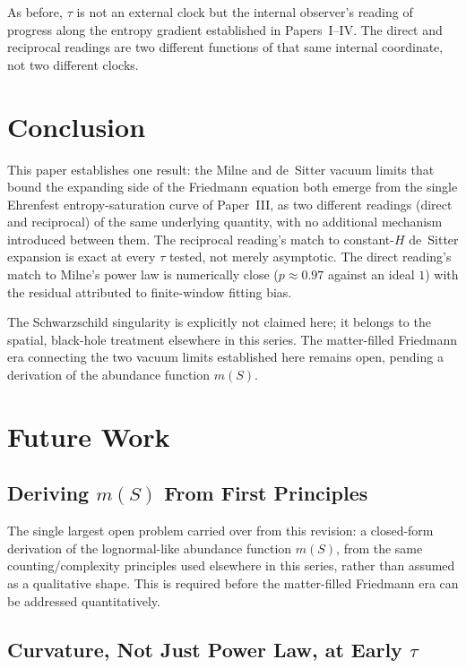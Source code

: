\documentclass[11pt]{article}
\begin{document}
As before, $\tau$ is not an external clock but the internal observer's
reading of progress along the entropy gradient established in
Papers~I--IV. The direct and reciprocal readings are two different
functions of that same internal coordinate, not two different clocks.

\section{Conclusion}
\label{sec:conclusion}

This paper establishes one result: the Milne and de~Sitter vacuum limits that bound the
expanding side of the Friedmann equation both emerge from the single
Ehrenfest entropy-saturation curve of Paper~III, as two different
readings (direct and reciprocal) of the same underlying quantity, with
no additional mechanism introduced between them. The reciprocal
reading's match to constant-$H$ de~Sitter expansion is exact at every
$\tau$ tested, not merely asymptotic. The direct reading's match to
Milne's power law is numerically close ($p\approx0.97$ against an ideal
$1$) with the residual attributed to finite-window fitting bias.

The Schwarzschild singularity is explicitly not claimed here; it belongs
to the spatial, black-hole treatment elsewhere in this series. The
matter-filled Friedmann era connecting the two vacuum limits established
here remains open, pending a derivation of the abundance function
$m(S)$.

\section{Future Work}
\label{sec:future}

\subsection*{Deriving $m(S)$ From First Principles}

The single largest open problem carried over from this revision: a
closed-form derivation of the lognormal-like abundance function $m(S)$,
from the same counting/complexity principles used elsewhere in this
series, rather than assumed as a qualitative shape. This is required
before the matter-filled Friedmann era can be addressed quantitatively.

\subsection*{Curvature, Not Just Power Law, at Early $\tau$}
\end{document}
